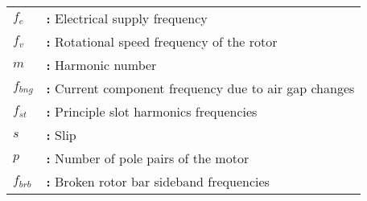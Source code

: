 \begin{tabular}{@{}p{2cm}l}
{\bf{$f_e$}} & {\bf:} Electrical supply frequency\\
{\bf{$f_v$}} & {\bf:} Rotational speed frequency of the rotor\\
{\bf{$m$}} & {\bf:} Harmonic number\\
{\bf{$f_{bng}$}} & {\bf:} Current component frequency due to air gap changes\\
{\bf{$f_{st}$}} & {\bf:} Principle slot harmonics frequencies\\
{\bf{$s$}} & {\bf:} Slip\\
{\bf{$p$}} & {\bf:} Number of pole pairs of the motor\\
{\bf{$f_{brb}$}} & {\bf:} Broken rotor bar sideband frequencies\\
\end{tabular}
